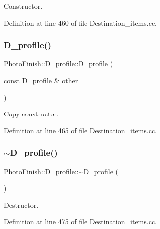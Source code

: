 Constructor. 



Definition at line 460 of file Destination\+\_\+items.\+cc.

\mbox{\label{class_photo_finish_1_1_d__profile_a5b840e8fc4a0550a8c49e72e93e40463}} 
\subsubsection{\texorpdfstring{D\+\_\+profile()}{D\_profile()}\hspace{0.1cm}{\footnotesize\ttfamily [4/4]}}
{\footnotesize\ttfamily Photo\+Finish\+::\+D\+\_\+profile\+::\+D\+\_\+profile (\begin{DoxyParamCaption}\item[{const \hyperlink{class_photo_finish_1_1_d__profile}{D\+\_\+profile} \&}]{other }\end{DoxyParamCaption})}



Copy constructor. 



Definition at line 465 of file Destination\+\_\+items.\+cc.

\mbox{\label{class_photo_finish_1_1_d__profile_a3d62633c6030dcae01e7a63760a83c77}} 
\subsubsection{\texorpdfstring{$\sim$\+D\+\_\+profile()}{~D\_profile()}}
{\footnotesize\ttfamily Photo\+Finish\+::\+D\+\_\+profile\+::$\sim$\+D\+\_\+profile (\begin{DoxyParamCaption}{ }\end{DoxyParamCaption})}



Destructor. 



Definition at line 475 of file Destination\+\_\+items.\+cc.



